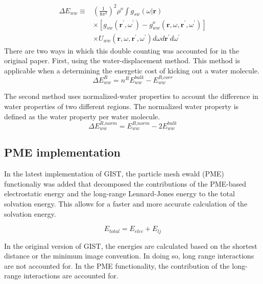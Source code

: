 \documentclass[9pt,tutorial]{livecoms}
\begin{document}
\begin{equation}
\begin{aligned}
	\Delta E_\textit{ww} \equiv & \left(\frac{1}{8\pi^2} \right)^2 \rho^o \int g_\textit{sw}\left(\omega|\textbf{r}\right) \\
	& \times \left[g_\textit{sw}\left(\textbf{r}^\prime , \omega^\prime \right) - g^o_\textit{ww} \left(\textbf{r}, \omega, \textbf{r}^\prime, \omega^\prime \right)\right] \\
	& \times U_\textit{ww}\left(\textbf{r}, \omega, \textbf{r}^\prime, \omega^\prime\right)d\omega d\textbf{r}^\prime d\omega^\prime
\end{aligned}
\end{equation}
There are two ways in which this double counting was accounted for in the original paper. First, using the water-displacement method. This method is applicable when a determining the energetic cost of kicking out a water molecule. 
\begin{equation}
	\Delta E^R_\textit{ww} = n^\textit{R} E^\textit{bulk}_\textit{ww} - E^\textit{R,corr}_\textit{ww}
\end{equation}

The second method uses normalized-water properties to account the difference in water properties of two different regions. The normalized water property is defined as the water property per water molecule. 
\begin{equation}
	\Delta E^\textit{R,norm}_\textit{ww} = E^\textit{R,norm}_\textit{ww} - 2E^\textit{bulk}_\textit{ww}
\end{equation}

\subsection{PME implementation}

In the latest implementation of GIST, the particle mesh ewald (PME) functionaliy was added that decomposed the contributions of the PME-based electrostatic energy and the long-range Lennard-Jones energy to the total solvation energy. This allows  for a faster and more accurate calculation of the solvation energy.

\begin{equation}
	E_\textit{total} = E_\textit{elec} + E_\textit{lj}
\end{equation}

In the original version of GIST, the energies are calculated based on the shortest distance or the minimum image convention. In doing so, long range interactions are not accounted for. In the PME functionality, the contribution of the long-range interactions are accounted for.
\end{document}
